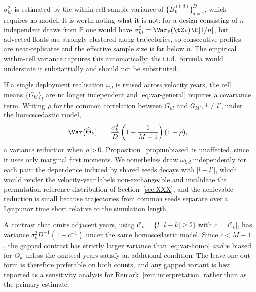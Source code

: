 \begin{remark}
\label{rem:sigma}
$\sigma^2_{kl}$ is estimated by the within-cell sample variance of $\{B_k^{(l,d)}\}_{d=1}^{D}$,
which requires no model. It is worth noting what it is not: for a design consisting of $n$
independent draws from $\mathbb{P}$ one would have
$\sigma^2_{kl} = \Var_{\mathbb{P}}(\tZ_k)\,\E[1/n]$, but advected floats are strongly clustered
along trajectories, so consecutive profiles are near-replicates and the effective sample size is
far below $n$. The empirical within-cell variance captures this automatically; the i.i.d.\ formula
would understate it substantially and should not be substituted.
\end{remark}

\begin{remark}
\label{rem:crn}
If a single deployment realisation $\omega_d$ is reused across velocity years, the cell means
$\{\bar{G}_{kl}\}_l$ are no longer independent and \eqref{eq:var-general} requires a covariance
term. Writing $\rho$ for the common correlation between $\bar{G}_{kl}$ and $\bar{G}_{kl'}$,
$l \neq l'$, under the homoscedastic model,
\begin{equation}
  \Var\big(\widehat{\Theta}_k\big)
  \;=\; \frac{\sigma_k^2}{D}\left(1 + \frac{1}{M-1}\right)(1-\rho) ,
\end{equation}
a variance reduction when $\rho > 0$. Proposition~\ref{prop:unbiased} is unaffected, since it uses
only marginal first moments. We nonetheless draw $\omega_{l,d}$ independently for each pair: the
dependence induced by shared seeds decays with $|l - l'|$, which would render the velocity-year
labels non-exchangeable and invalidate the permutation reference distribution of
Section~\ref{sec:XXX}, and the achievable reduction is small because trajectories from common seeds
separate over a Lyapunov time short relative to the simulation length.
\end{remark}

\begin{remark}
\label{rem:gap}
A contrast that omits adjacent years, using $\mathcal{C}_k = \{l : |l-k| \ge 2\}$ with
$c = |\mathcal{C}_k|$, has variance $\sigma_k^2 D^{-1}(1 + c^{-1})$ under the same homoscedastic
model. Since $c < M-1$, the gapped contrast has strictly larger variance than
\eqref{eq:var-homo} \emph{and} is biased for $\Theta_k$ unless the omitted years satisfy an
additional condition. The leave-one-out form is therefore preferable on both counts, and any
gapped variant is best reported as a sensitivity analysis for Remark~\ref{rem:interpretation}
rather than as the primary estimate.
\end{remark}

